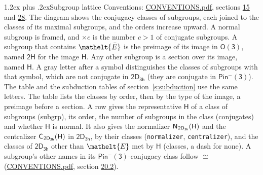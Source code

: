 \documentclass[10pt,a4paper]{article}
\makeatletter
\renewcommand\section{\@startsection{section}{1}{\z@}{-3ex plus -1ex minus -.2ex}%
  {1.2ex plus .2ex}{\normalfont\large\sffamily\bfseries\color{parttitle}}}
\numberwithin{equation}{section}
\newcommand{\eltfont}[1]{{\let\sigma\eltsigma\mathelt{#1}}}
\newcommand{\grp}[1]{\mathsf{#1}}
\newcommand{\cls}[1]{\eltfont{#1}}
\newcommand{\elt}[1]{\eltfont{#1}}
\newcommand{\samecls}{\cong}
\newcommand{\barred}[1]{\bar{#1}}
\newcommand{\hairsp}{\mkern1mu}
\makeatother
\begin{document}
\section{Subgroup lattice}\label{s:subgroups}
Conventions: \href{../../CONVENTIONS.pdf}{CONVENTIONS.pdf}, sections \href{../../../rotation/CONVENTIONS.pdf\#conv.15}{15} and \href{../../CONVENTIONS.pdf\#conv.28}{28}.
The diagram shows the conjugacy classes of subgroups, each joined to the classes of its maximal subgroups, and the orders increase upward. A normal subgroup is framed, and ${\times}c$ is the number $c > 1$ of conjugate subgroups. \label{n:group.H}A subgroup that contains $\elt{\barred{E}}$ is the preimage of its image in $\grp{O(3)}$, named $\grp{2H}$ for the image $\grp{H}$. Any other subgroup is a section over its image, named $\grp{H}$. \label{n:mark.letter}A gray letter after a symbol distinguishes the classes of subgroups with that symbol, which are not conjugate in $\grp{2D_{3h}}$ (they are conjugate in \href{Pinminus3.pdf}{$\grp{Pin^{-}(3)}$}). The table and the subduction tables of section~\ref{s:subduction} use the same letters. The table lists the classes by order, then by the type of the image, a preimage before a section. \label{n:head.subgroup}\label{n:head.order}\label{n:head.conjugates}\label{n:head.normal}A row gives the representative $\grp{H}$ of a class of subgroups (subgrp), its order, the number of subgroups in the class (conjugates) and whether $\grp{H}$ is normal. \label{n:group.normalizer}\label{n:group.centralizer}\label{n:head.classes}It also gives the normalizer $\grp{N}_{\hairsp \grp{2D_{3h}}}(\grp{H})$ and the centralizer $\grp{C}_{\hairsp \grp{2D_{3h}}}(\grp{H})$ in $\grp{2D_{3h}}$, by their classes (\texttt{normalizer}, \texttt{centralizer}), and the classes of $\grp{2D_{3h}}$ other than $\cls{E}$ met by $\grp{H}$ (classes, a dash for none). A subgroup's other names in its \href{Pinminus3.pdf}{$\grp{Pin^{-}(3)}$}-conjugacy class follow $\samecls$ (\href{../../CONVENTIONS.pdf}{CONVENTIONS.pdf}, section \href{../../CONVENTIONS.pdf\#conv.20.2}{20.2}).
\end{document}
